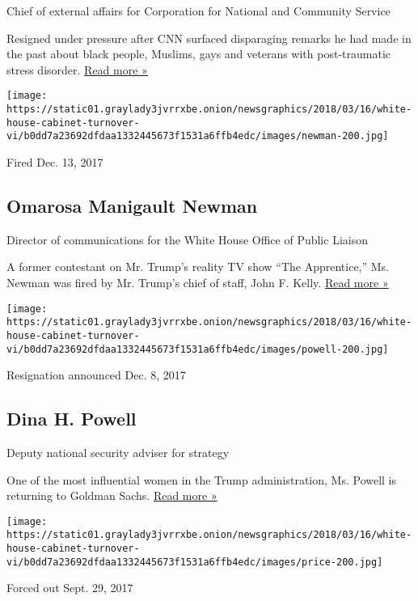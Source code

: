 Chief of external affairs for Corporation for National and Community
Service

Resigned under pressure after CNN surfaced disparaging remarks he had
made in the past about black people, Muslims, gays and veterans with
post-traumatic stress disorder.
\href{https://www.nytimes3xbfgragh.onion/2018/01/20/us/politics/carl-higbie-resigns.html}{Read
more »}

\texttt{[image: https://static01.graylady3jvrrxbe.onion/newsgraphics/2018/03/16/white-house-cabinet-turnover-vi/b0dd7a23692dfdaa1332445673f1531a6ffb4edc/images/newman-200.jpg]}

Fired Dec. 13, 2017

\hypertarget{omarosa-manigault-newman}{%
\subsection{Omarosa Manigault Newman}\label{omarosa-manigault-newman}}

Director of communications for the White House Office of Public Liaison

A former contestant on Mr. Trump's reality TV show ``The Apprentice,''
Ms. Newman was fired by Mr. Trump's chief of staff, John F. Kelly.
\href{https://www.nytimes3xbfgragh.onion/2017/12/15/us/politics/omarosa-manigault-newman-white-house.html}{Read
more »}

\texttt{[image: https://static01.graylady3jvrrxbe.onion/newsgraphics/2018/03/16/white-house-cabinet-turnover-vi/b0dd7a23692dfdaa1332445673f1531a6ffb4edc/images/powell-200.jpg]}

Resignation announced Dec. 8, 2017

\hypertarget{dina-h-powell}{%
\subsection{Dina H. Powell}\label{dina-h-powell}}

Deputy national security adviser for strategy

One of the most influential women in the Trump administration, Ms.
Powell is returning to Goldman Sachs.
\href{https://www.nytimes3xbfgragh.onion/2017/12/08/us/politics/dina-powell-trump-resign.html}{Read
more »}

\texttt{[image: https://static01.graylady3jvrrxbe.onion/newsgraphics/2018/03/16/white-house-cabinet-turnover-vi/b0dd7a23692dfdaa1332445673f1531a6ffb4edc/images/price-200.jpg]}

Forced out Sept. 29, 2017


